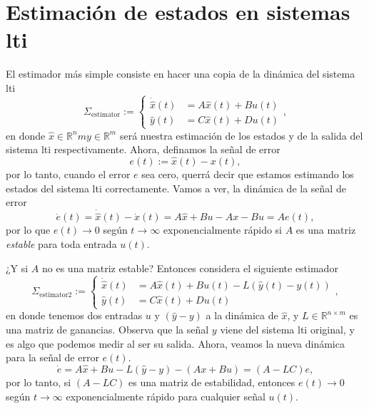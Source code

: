 \section{Estimación de estados en sistemas lti}
El estimador más simple consiste en hacer una copia de la dinámica del sistema lti
\begin{equation}
	\Sigma_{\text{estimator}} := \begin{cases}
		\dot{\hat x}(t) &= A \hat x(t) + B u(t) \\
		\hat y(t) &= C\hat x(t) + D u(t)
	\end{cases},
\label{eq: sigmaest}
\end{equation}
en donde $\hat x\in\mathbb{R}^nm y\in\mathbb{R}^m$ será nuestra estimación de los estados y de la salida del sistema lti respectivamente. Ahora, definamos la señal de error
\begin{equation}
e(t) := \hat x(t) - x(t),
\end{equation}
por lo tanto, cuando el error $e$ sea cero, querrá decir que estamos estimando los estados del sistema lti correctamente. Vamos a ver, la dinámica de la señal de error
\begin{equation}
	\dot e(t) = \dot{\hat x}(t) - \dot x(t) = A\hat x + Bu - Ax - Bu = Ae(t),
\end{equation}
por lo que $e(t)\to 0$ según $t\to\infty$ exponencialmente rápido si $A$ es una matriz \emph{estable} para toda entrada $u(t)$.

¿Y si $A$ no es una matriz estable? Entonces considera el siguiente estimador
\begin{equation}
	\Sigma_{\text{estimator2}} := \begin{cases}
		\dot{\hat x}(t) &= A \hat x(t) + B u(t) - L(\hat y(t) - y(t)) \\
		\hat y(t) &= C\hat x(t) + D u(t)
	\end{cases},
\label{eq: sigmaest2}
\end{equation}
en donde tenemos dos entradas $u$ y $(\hat y - y)$ a la dinámica de $\hat x$, y $L\in\mathbb{R}^{n\times m}$ es una matriz de ganancias. Observa que la señal $y$ viene del sistema lti original, y es algo que podemos medir al ser su salida. Ahora, veamos la nueva dinámica para la señal de error $e(t)$.
\begin{equation}
	\dot e = A\hat x + Bu - L(\hat y - y) - (Ax + Bu) = (A-LC)e,\label{eq: ed} 
\end{equation}
por lo tanto, si $(A-LC)$ es una matriz de estabilidad, entonces $e(t)\to 0$ según $t\to\infty$ exponencialmente rápido para cualquier señal $u(t)$.

